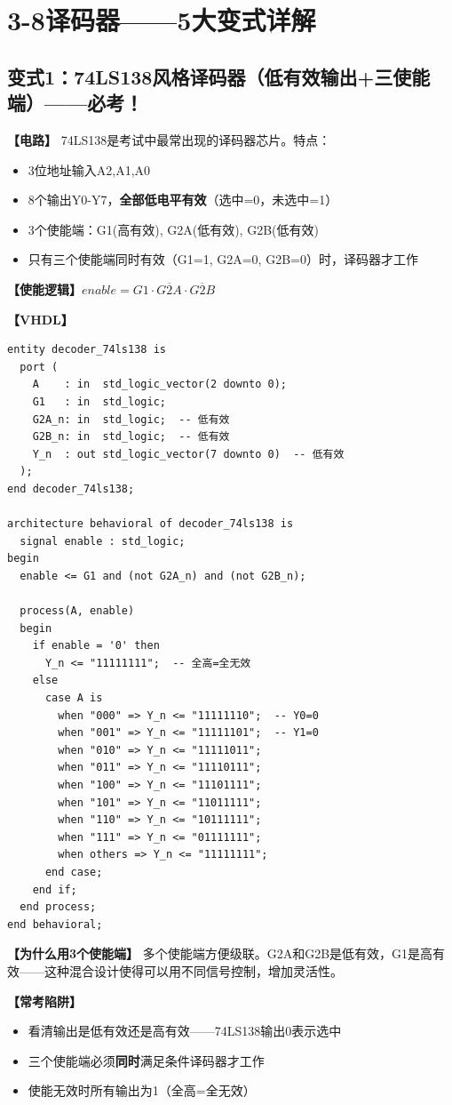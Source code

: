 \chapter{3-8译码器——5大变式详解}

\section{变式1：74LS138风格译码器（低有效输出+三使能端）——必考！}

\begin{detailbox}[完整教学]

\textbf{【电路】}
74LS138是考试中最常出现的译码器芯片。特点：
\begin{itemize}
  \item 3位地址输入A2,A1,A0
  \item 8个输出Y0-Y7，\textbf{全部低电平有效}（选中=0，未选中=1）
  \item 3个使能端：G1(高有效), G2A(低有效), G2B(低有效)
  \item 只有三个使能端同时有效（G1=1, G2A=0, G2B=0）时，译码器才工作
\end{itemize}

\textbf{【使能逻辑】}$enable = G1 \cdot \overline{G2A} \cdot \overline{G2B}$

\textbf{【VHDL】}
\begin{lstlisting}
entity decoder_74ls138 is
  port (
    A    : in  std_logic_vector(2 downto 0);
    G1   : in  std_logic;
    G2A_n: in  std_logic;  -- 低有效
    G2B_n: in  std_logic;  -- 低有效
    Y_n  : out std_logic_vector(7 downto 0)  -- 低有效
  );
end decoder_74ls138;

architecture behavioral of decoder_74ls138 is
  signal enable : std_logic;
begin
  enable <= G1 and (not G2A_n) and (not G2B_n);

  process(A, enable)
  begin
    if enable = '0' then
      Y_n <= "11111111";  -- 全高=全无效
    else
      case A is
        when "000" => Y_n <= "11111110";  -- Y0=0
        when "001" => Y_n <= "11111101";  -- Y1=0
        when "010" => Y_n <= "11111011";
        when "011" => Y_n <= "11110111";
        when "100" => Y_n <= "11101111";
        when "101" => Y_n <= "11011111";
        when "110" => Y_n <= "10111111";
        when "111" => Y_n <= "01111111";
        when others => Y_n <= "11111111";
      end case;
    end if;
  end process;
end behavioral;
\end{lstlisting}

\textbf{【为什么用3个使能端】}
多个使能端方便级联。G2A和G2B是低有效，G1是高有效——这种混合设计使得可以用不同信号控制，增加灵活性。

\textbf{【常考陷阱】}
\begin{itemize}
  \item 看清输出是低有效还是高有效——74LS138输出0表示选中
  \item 三个使能端必须\textbf{同时}满足条件译码器才工作
  \item 使能无效时所有输出为1（全高=全无效）
\end{itemize}

\end{detailbox}


